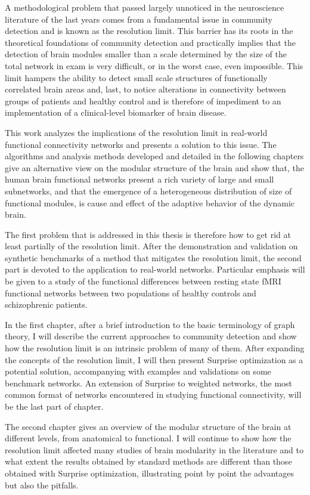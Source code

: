 A methodological problem that passed largely unnoticed in the neuroscience literature of the last years comes from a fundamental issue in community detection and is known as the resolution limit. This barrier has its roots in the theoretical foundations of community detection and practically implies that the detection of brain modules smaller than a scale determined by the size of the total network in exam is very difficult, or in the worst case, even impossible. This limit hampers the ability to detect small scale structures of functionally correlated brain areas and, last, to notice alterations in connectivity between groups of patients and healthy control and is therefore of impediment to an implementation of a clinical-level biomarker of brain disease.

This work analyzes the implications of the resolution limit in real-world functional connectivity networks and presents a solution to this issue.
The algorithms and analysis methods developed and detailed in the following chapters give an alternative view on the modular structure of the brain and show that, the human brain functional networks present a rich variety of large and small subnetworks, and that the emergence of a heterogeneous distribution of size of functional modules, is cause and effect of the adaptive behavior of the dynamic brain.

The first problem that is addressed in this thesis is therefore how to get rid at least partially of the resolution limit. 
After the demonstration and validation on synthetic benchmarks of a method that mitigates the resolution limit, the second part is devoted to the application to real-world networks. Particular emphasis will be given to a study of the functional differences between resting state fMRI functional networks between two populations of healthy controls and schizophrenic patients. 

In the first chapter, after a brief introduction to the basic terminology of graph theory, I will describe the current approaches to community detection and show how the resolution limit is an intrinsic problem of many of them. After expanding the concepts of the resolution limit, I will then present Surprise optimization as a potential solution, accompanying with examples and validations on some benchmark networks. An extension of Surprise to weighted networks, the most common format of networks encountered in studying functional connectivity, will be the last part of chapter.

The second chapter gives an overview of the modular structure of the brain at different levels, from anatomical to functional. I will continue to show how the resolution limit affected many studies of brain modularity in the literature and to what extent the results obtained by standard methods are different than those obtained with Surprise optimization, illustrating point by point the advantages but also the pitfalls.

